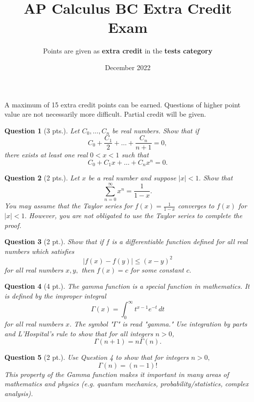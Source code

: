 \documentclass{article}
\title{AP Calculus BC Extra Credit Exam}
\author{Points are given as \textbf{extra credit} in the \textbf{tests category}}
\date{December 2022}
\newtheorem{question}{Question}
\begin{document}
\maketitle

A maximum of 15 extra credit points can be earned. Questions of higher point value are not necessarily more difficult. Partial credit will be given.

\begin{question}[3 pts.]
Let $C_0, \dots, C_n$ be real numbers. Show that if $$C_0 + \frac{C_1} 2 + \dots + \frac{C_n}{n+1} = 0,$$ there exists at least one real $0 < x < 1$ such that $$C_0 + C_1x + \dots + C_nx^n = 0.$$ 
\end{question}

\begin{question}[2 pts.]
Let $x$ be a real number and suppose $|x| < 1.$ Show that $$\sum_{n = 0}^\infty x^n = \frac{1}{1 - x}.$$ You may assume that the Taylor series for $f(x) = \frac{1}{1-x}$ converges to $f(x)$ for $|x| < 1.$ However, you are not obligated to use the Taylor series to complete the proof.\\
\end{question}

\begin{question}[2 pt.]
Show that if $f$ is a differentiable function defined for all real numbers which satisfies $$|f(x) - f(y)| \leq (x - y)^2$$ for all real numbers $x, y,$ then $f(x) = c$ for some constant $c.$
\end{question}

\begin{question}[4 pt.]
The gamma function is a special function in mathematics. It is defined by the improper integral $$\Gamma(x) = \int_0^\infty t^{x-1}e^{-t} \, dt$$ for all real numbers $x.$ The symbol "$\Gamma$" is read "gamma." Use integration by parts and L'Hospital's rule to show that for all integers $n > 0$, $$\Gamma(n+1) = n\Gamma(n).$$ 
\end{question}

\begin{question}[2 pt.]
Use Question 4 to show that for integers $n > 0,$ $$\Gamma(n) = (n - 1)!$$ This property of the Gamma function makes it important in many areas of mathematics and physics (e.g. quantum mechanics, probability/statistics, complex analysis).
\end{question}
\end{document}
